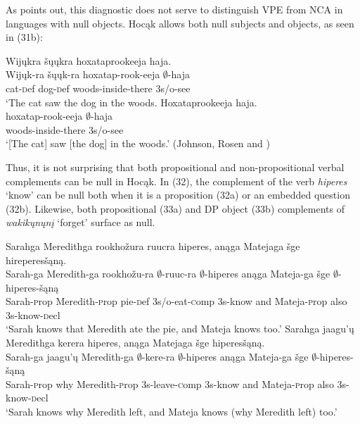 \documentclass[output=paper]{LSP/langsci}
\begin{document}
As \citet{Fortin2007} points out, this diagnostic does not serve to distinguish VPE from NCA in languages with null objects. Hocąk allows both null subjects and objects, as seen in (31b):

\begin{exe}
\ex
\begin{xlist}
\ex
\glll Wijųkra šųųkra hoxataprookeeja haja.\\
Wijųk-ra šųųk-ra hoxatap-rook-eeja $\emptyset$-haja\\
cat-{\textsc def} dog-{\textsc def} woods-inside-there {\textsc 3s/o}-see\\
\trans `The cat saw the dog in the woods.
\ex
\glll Hoxataprookeeja haja.\\
hoxatap-rook-eeja $\emptyset$-haja\\
woods-inside-there {\textsc 3s/o}-see\\
\trans `[The cat] saw [the dog] in the woods.' (Johnson, Rosen and \citealt[7]{Schuck2013})
\end{xlist}
\end{exe}


Thus, it is not surprising that both propositional and non-propositional verbal complements can be null in Hocąk. In (32), the complement of the verb \emph{hiperes} `know' can be null both when it is a proposition (32a) or an embedded question (32b). Likewise, both propositional (33a) and DP object (33b) complements of \emph{wakikųnųnį} `forget' surface as null.

\begin{exe}
\ex
\begin{xlist}
\ex
\glll Sarahga Meredithga rookhožura ruucra hiperes, anąga Matejaga šge hireperesšąną.\\
Sarah-ga Meredith-ga rookhožu-ra $\emptyset$-ruuc-ra $\emptyset$-hiperes anąga Mateja-ga šge $\emptyset$-hiperes-šąną\\
Sarah-{\textsc prop} Meredith-{\textsc prop} pie-{\textsc def} {\textsc 3s/o}-eat-{\textsc comp} {\textsc 3s}-know and Mateja-{\textsc prop} also {\textsc 3s}-know-{\textsc decl}\\
\trans `Sarah knows that Meredith ate the pie, and Mateja knows too.'
\ex
\glll Sarahga jaagu'ų Meredithga kerera hiperes, anąga Matejaga šge hiperesšąną.\\
Sarah-ga jaagu'ų Meredith-ga $\emptyset$-kere-ra $\emptyset$-hiperes anąga Mateja-ga šge $\emptyset$-hiperes-šąną\\
Sarah-{\textsc prop} why Meredith-{\textsc prop} {\textsc 3s}-leave-{\textsc comp} {\textsc 3s}-know and Mateja-{\textsc prop} also {\textsc 3s}-know-{\textsc decl}\\
\trans `Sarah knows why Meredith left, and Mateja knows (why Meredith left) too.'
\end{xlist}
\end{exe}
\end{document}
